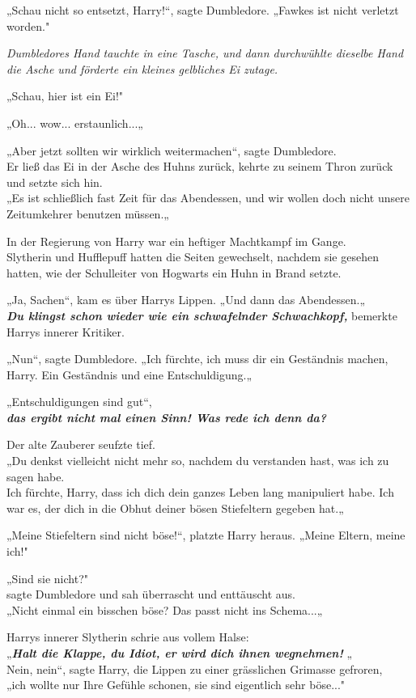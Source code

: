 {„Schau nicht so entsetzt, Harry!“, sagte Dumbledore. „Fawkes ist nicht verletzt worden."

\emph{Dumbledores Hand tauchte in eine Tasche, und dann durchwühlte dieselbe Hand die Asche und förderte ein kleines gelbliches Ei zutage.}

„Schau, hier ist ein Ei!"

„Oh... wow... erstaunlich...„

„Aber jetzt sollten wir wirklich weitermachen“, sagte Dumbledore.\\ Er ließ das Ei in der Asche des Huhns zurück, kehrte zu seinem Thron zurück und setzte sich hin.\\ „Es ist schließlich fast Zeit für das Abendessen, und wir wollen doch nicht unsere Zeitumkehrer benutzen müssen.„

In der Regierung von Harry war ein heftiger Machtkampf im Gange.\\ Slytherin und Hufflepuff hatten die Seiten gewechselt, nachdem sie gesehen hatten, wie der Schulleiter von Hogwarts ein Huhn in Brand setzte.

„Ja, Sachen“, kam es über Harrys Lippen. „Und dann das Abendessen.„\\ \textbf{\emph{Du klingst schon wieder wie ein schwafelnder Schwachkopf,}} bemerkte Harrys innerer Kritiker.

„Nun“, sagte Dumbledore. „Ich fürchte, ich muss dir ein Geständnis machen, Harry. Ein Geständnis und eine Entschuldigung.„

„Entschuldigungen sind gut“,\\ \textbf{\emph{das ergibt nicht mal einen Sinn! Was rede ich denn da?}}

Der alte Zauberer seufzte tief.\\ „Du denkst vielleicht nicht mehr so, nachdem du verstanden hast, was ich zu sagen habe.\\ Ich fürchte, Harry, dass ich dich dein ganzes Leben lang manipuliert habe. Ich war es, der dich in die Obhut deiner bösen Stiefeltern gegeben hat.„

„Meine Stiefeltern sind nicht böse!“, platzte Harry heraus. „Meine Eltern, meine ich!"

„Sind sie nicht?"\\ sagte Dumbledore und sah überrascht und enttäuscht aus.\\ „Nicht einmal ein bisschen böse? Das passt nicht ins Schema...„

Harrys innerer Slytherin schrie aus vollem Halse:\\ „\textbf{\emph{Halt die Klappe, du Idiot, er wird dich ihnen wegnehmen!}} „\\ Nein, nein“, sagte Harry, die Lippen zu einer grässlichen Grimasse gefroren,\\ „ich wollte nur Ihre Gefühle schonen, sie sind eigentlich sehr böse..."

}
